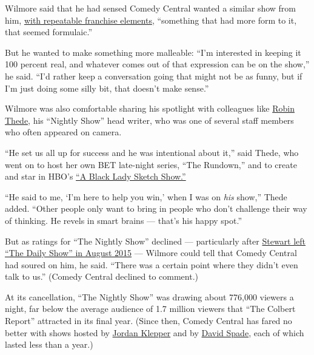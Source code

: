 Wilmore said that he had sensed Comedy Central wanted a similar show
from him,
\href{http://www.cc.com/video-clips/hgeu2x/the-nightly-show-with-larry-wilmore-keep-it-100---larry-s-forced-to-play-favorites}{with
repeatable franchise elements}, ``something that had more form to it,
that seemed formulaic.''

But he wanted to make something more malleable: ``I'm interested in
keeping it 100 percent real, and whatever comes out of that expression
can be on the show,'' he said. ``I'd rather keep a conversation going
that might not be as funny, but if I'm just doing some silly bit, that
doesn't make sense.''

Wilmore was also comfortable sharing his spotlight with colleagues like
\href{https://www.nytimes3xbfgragh.onion/2017/10/08/arts/television/on-the-rundown-robin-thede-is-filling-a-void-in-late-night-talk.html?searchResultPosition=2}{Robin
Thede}, his ``Nightly Show'' head writer, who was one of several staff
members who often appeared on camera.

``He set us all up for success and he was intentional about it,'' said
Thede, who went on to host her own BET late-night series, ``The
Rundown,'' and to create and star in HBO's
\href{https://www.nytimes3xbfgragh.onion/2019/07/31/arts/television/a-black-lady-sketch-show-hbo.html?searchResultPosition=1}{``A
Black Lady Sketch Show.''}

``He said to me, `I'm here to help you win,' when I was on \emph{his}
show,'' Thede added. ``Other people only want to bring in people who
don't challenge their way of thinking. He revels in smart brains ---
that's his happy spot.''

But as ratings for ``The Nightly Show'' declined --- particularly after
\href{https://www.nytimes3xbfgragh.onion/2015/08/07/arts/television/jon-stewart-signs-off-from-daily-show-with-wit-and-sincerity.html}{Stewart
left ``The Daily Show'' in August 2015} --- Wilmore could tell that
Comedy Central had soured on him, he said. ``There was a certain point
where they didn't even talk to us.'' (Comedy Central declined to
comment.)

At its cancellation, ``The Nightly Show'' was drawing about 776,000
viewers a night, far below the average audience of 1.7 million viewers
that ``The Colbert Report'' attracted in its final year. (Since then,
Comedy Central has fared no better with shows hosted by
\href{https://www.nytimes3xbfgragh.onion/2017/09/15/arts/jordan-klepper-wants-to-be-a-colbert-for-the-breitbart-era.html}{Jordan
Klepper} and by
\href{https://www.nytimes3xbfgragh.onion/2019/07/22/arts/television/david-spade-is-back-on-tv-even-though-he-never-left.html}{David
Spade}, each of which lasted less than a year.)

